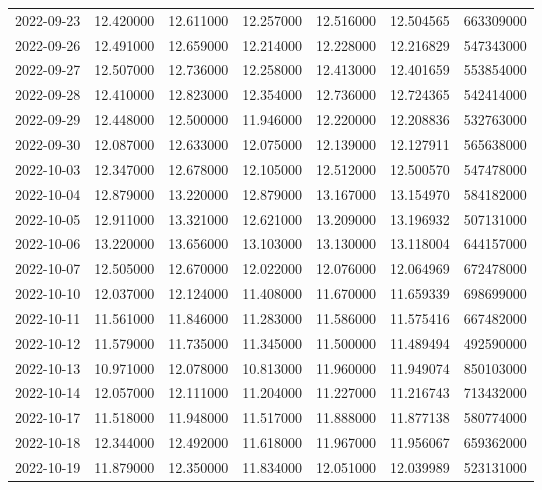 \begin{tabular}{lrrrrrr}
2022-09-23 &   12.420000 &   12.611000 &   12.257000 &   12.516000 &   12.504565 &   663309000 \\
2022-09-26 &   12.491000 &   12.659000 &   12.214000 &   12.228000 &   12.216829 &   547343000 \\
2022-09-27 &   12.507000 &   12.736000 &   12.258000 &   12.413000 &   12.401659 &   553854000 \\
2022-09-28 &   12.410000 &   12.823000 &   12.354000 &   12.736000 &   12.724365 &   542414000 \\
2022-09-29 &   12.448000 &   12.500000 &   11.946000 &   12.220000 &   12.208836 &   532763000 \\
2022-09-30 &   12.087000 &   12.633000 &   12.075000 &   12.139000 &   12.127911 &   565638000 \\
2022-10-03 &   12.347000 &   12.678000 &   12.105000 &   12.512000 &   12.500570 &   547478000 \\
2022-10-04 &   12.879000 &   13.220000 &   12.879000 &   13.167000 &   13.154970 &   584182000 \\
2022-10-05 &   12.911000 &   13.321000 &   12.621000 &   13.209000 &   13.196932 &   507131000 \\
2022-10-06 &   13.220000 &   13.656000 &   13.103000 &   13.130000 &   13.118004 &   644157000 \\
2022-10-07 &   12.505000 &   12.670000 &   12.022000 &   12.076000 &   12.064969 &   672478000 \\
2022-10-10 &   12.037000 &   12.124000 &   11.408000 &   11.670000 &   11.659339 &   698699000 \\
2022-10-11 &   11.561000 &   11.846000 &   11.283000 &   11.586000 &   11.575416 &   667482000 \\
2022-10-12 &   11.579000 &   11.735000 &   11.345000 &   11.500000 &   11.489494 &   492590000 \\
2022-10-13 &   10.971000 &   12.078000 &   10.813000 &   11.960000 &   11.949074 &   850103000 \\
2022-10-14 &   12.057000 &   12.111000 &   11.204000 &   11.227000 &   11.216743 &   713432000 \\
2022-10-17 &   11.518000 &   11.948000 &   11.517000 &   11.888000 &   11.877138 &   580774000 \\
2022-10-18 &   12.344000 &   12.492000 &   11.618000 &   11.967000 &   11.956067 &   659362000 \\
2022-10-19 &   11.879000 &   12.350000 &   11.834000 &   12.051000 &   12.039989 &   523131000 \\

\end{tabular}
